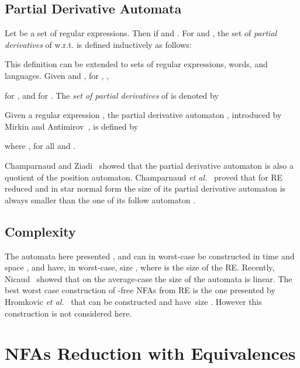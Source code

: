 \documentclass{llncs}
\newcommand{\nfas}{NFAs\xspace}
\newcommand{\re}{RE\xspace}
\begin{document}
\subsection{Partial Derivative Automata}
\label{sec:pd}
Let  be a set of regular expressions. Then  if  and .  For 
and , the set  of
\emph{partial derivatives} of  w.r.t.  is defined
inductively as follows:
{\small }

\noindent This definition can be extended to sets of regular
expressions, words, and languages.  Given  and
,  for ,
,

for , and  for .  The
\emph{set of partial derivatives} of  is denoted by


Given a regular expression , the partial derivative automaton
, introduced by Mirkin and
Antimirov~\cite{b.g.mirkin66:_algor_for_const_base_in,antimirov96:_partial_deriv_regul_expres_finit_autom_const},
is defined by
\begin{center}
\end{center}
\noindent where , for all
 and .
\begin{proposition} 
\end{proposition}
\noindent Champarnaud and
Ziadi~\cite{champarnaud02:_canon_deriv_partial_deriv_and} showed that
the partial derivative automaton is also a quotient of the position
automaton. Champarnaud \emph{et
  al.}~\cite{j.-m.07:_normal_expres_and_finit_autom} proved that for
\re reduced and in star normal form  the size of
its partial derivative automaton  is always smaller than the one of
its follow automaton .
\subsection{Complexity}
\label{ref:complexity}
The automata here presented ,  and  can
in worst-case be constructed in time and space , and
have, in worst-case, size , where  is the size of
the \re. Recently,
Nicaud~\cite{nicaud09:_averag_size_of_glush_autom_c} showed that on
the average-case the size of the  automata is linear.
The best worst case construction of
-free \nfas from \re is the one presented by Hromkovic
\emph{et al.}~\cite{hromkovic01:_trans_regul_expres_into_small} that
can be constructed and have~size . However
this construction is not considered here.

\section{\nfas Reduction with Equivalences}
\end{document}
